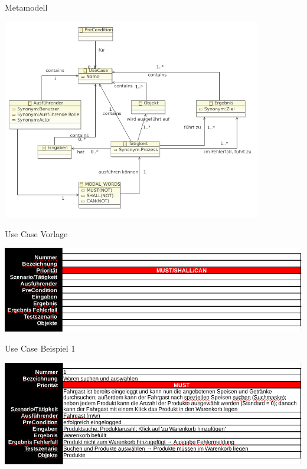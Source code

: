 \documentclass{beamer}
\begin{document}
\begin{frame}{Metamodell}
	\begin{center}
		\includegraphics[width=0.85\textwidth]{img/metamodell.png}
	\end{center}
\end{frame}

\begin{frame}{Use Case Vorlage}
	\begin{center}
		\includegraphics[width=\textwidth]{img/use-case-vorlage.png}
	\end{center}
\end{frame}

\begin{frame}{Use Case Beispiel 1}
	\begin{center}
		\includegraphics[width=\textwidth]{img/use-case-bsp-1.png}
	\end{center}
\end{frame}
\end{document}
